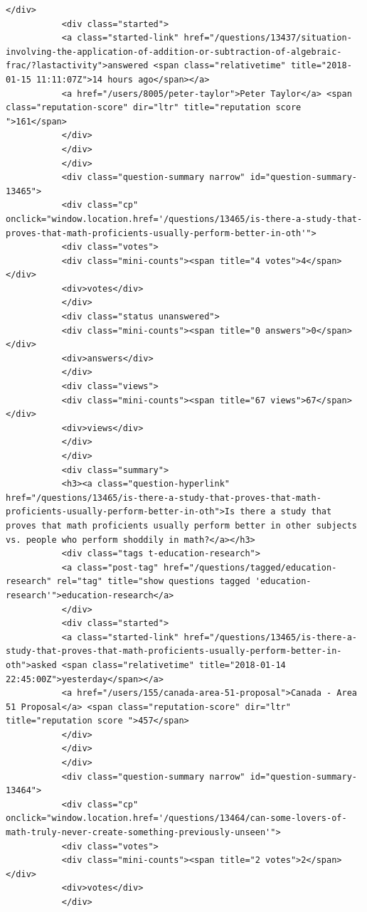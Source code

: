 \documentclass[11pt]{article}
\begin{document}
\begin{Verbatim}[commandchars=\\\{\}]
           </div>
           <div class="started">
           <a class="started-link" href="/questions/13437/situation-involving-the-application-of-addition-or-subtraction-of-algebraic-frac/?lastactivity">answered <span class="relativetime" title="2018-01-15 11:11:07Z">14 hours ago</span></a>
           <a href="/users/8005/peter-taylor">Peter Taylor</a> <span class="reputation-score" dir="ltr" title="reputation score ">161</span>
           </div>
           </div>
           </div>
           <div class="question-summary narrow" id="question-summary-13465">
           <div class="cp" onclick="window.location.href='/questions/13465/is-there-a-study-that-proves-that-math-proficients-usually-perform-better-in-oth'">
           <div class="votes">
           <div class="mini-counts"><span title="4 votes">4</span></div>
           <div>votes</div>
           </div>
           <div class="status unanswered">
           <div class="mini-counts"><span title="0 answers">0</span></div>
           <div>answers</div>
           </div>
           <div class="views">
           <div class="mini-counts"><span title="67 views">67</span></div>
           <div>views</div>
           </div>
           </div>
           <div class="summary">
           <h3><a class="question-hyperlink" href="/questions/13465/is-there-a-study-that-proves-that-math-proficients-usually-perform-better-in-oth">Is there a study that proves that math proficients usually perform better in other subjects vs. people who perform shoddily in math?</a></h3>
           <div class="tags t-education-research">
           <a class="post-tag" href="/questions/tagged/education-research" rel="tag" title="show questions tagged 'education-research'">education-research</a>
           </div>
           <div class="started">
           <a class="started-link" href="/questions/13465/is-there-a-study-that-proves-that-math-proficients-usually-perform-better-in-oth">asked <span class="relativetime" title="2018-01-14 22:45:00Z">yesterday</span></a>
           <a href="/users/155/canada-area-51-proposal">Canada - Area 51 Proposal</a> <span class="reputation-score" dir="ltr" title="reputation score ">457</span>
           </div>
           </div>
           </div>
           <div class="question-summary narrow" id="question-summary-13464">
           <div class="cp" onclick="window.location.href='/questions/13464/can-some-lovers-of-math-truly-never-create-something-previously-unseen'">
           <div class="votes">
           <div class="mini-counts"><span title="2 votes">2</span></div>
           <div>votes</div>
           </div>

\end{Verbatim}
\end{document}
